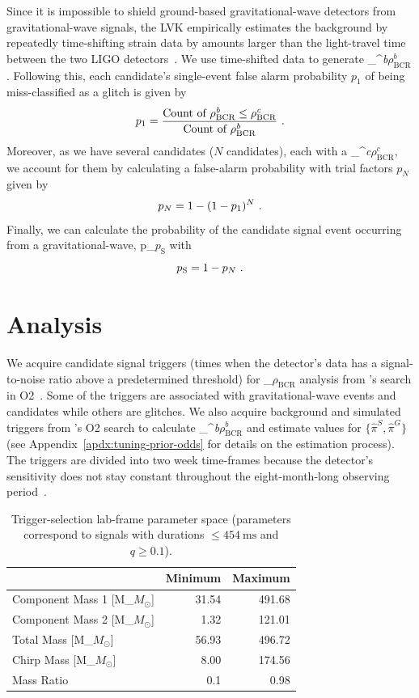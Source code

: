 \documentclass[
 nofootinbib,
 amsmath,amssymb,
 aps,
 twocolumn,
 superscriptaddress
]{revtex4-2}
\newcommand{\pycbc}{{\sc {{PyCBC}}}\xspace}
\newcommand{\fancytext}[1]{{\relax\ifmmode#1\else $#1$\fi}\xspace}
\newcommand{\mathcmd}[1]{{\sc \relax\ifmmode#1\else $#1$\fi}\xspace}
\newcommand{\bcr}{\mathcmd{\rho_\text{BCR}}}
\newcommand{\bgrdbcr}{\mathcmd{\rho_\text{BCR}^\textit{b}}}
\newcommand{\candbcr}{\mathcmd{\rho_\text{BCR}^\textit{c}}}
\newcommand{\msun}{\mathcmd{M_\odot}}
\newcommand{\fap}{\mathcmd{p_N}}
\newcommand{\pastrobcr}{\fancytext{p_\text{S}}}
\begin{document}
Since it is impossible to shield ground-based gravitational-wave detectors from gravitational-wave signals, the LVK empirically estimates the background by repeatedly time-shifting strain data by amounts larger than the light-travel time between the two LIGO detectors~\cite{GWTC1}. We use time-shifted data to generate \bgrdbcr. Following this, each candidate's single-event false alarm probability $p_1$ of being miss-classified as a glitch is given by
\begin{equation}
    p_1 = \frac{\text{Count of } \bgrdbcr \leq \candbcr}{\text{Count of } \bgrdbcr} \ .
\end{equation}
Moreover, as we have several candidates ($N$ candidates), each with a \candbcr, we account for them by calculating a false-alarm probability with trial factors $p_N$ given by
\begin{equation}
    \fap = 1 - (1-p_1)^N \ .
\end{equation}
Finally, we can calculate the probability of the candidate signal event occurring from  a gravitational-wave, \pastrobcr with 
\begin{equation}
\pastrobcr = 1 - \fap \ . 
\end{equation}


\section{Analysis}\label{sec:Analysis}

We acquire candidate signal triggers (times when the detector's data has a signal-to-noise ratio above a predetermined threshold) for \bcr analysis from \pycbc's search in O2~\cite{pycbc_code, pycbc_og0, pycbc_og1, pycbc_og2, pycbc_og3, pycbc_og4, pycbc_og5, pycbc_og6, public_ligo_o2_triggers}.  Some of the triggers are associated with gravitational-wave events and candidates while others are glitches. We also acquire background and simulated triggers from \pycbc's O2 search to calculate \bgrdbcr and estimate values for $\{\hat{\pi}^S,\hat{\pi}^G\}$ (see Appendix~\ref{apdx:tuning-prior-odds} for details on the estimation process). The triggers are divided into two week time-frames because the detector's sensitivity does not stay constant throughout the eight-month-long observing period~\cite{pycbc_og4}.

\begin{table}[t]
\caption[BBH parameters correspond to duration $\leq454\ \text{ms}$]{\label{tab:parameters}Trigger-selection lab-frame parameter space (parameters correspond to signals with durations $\leq454 \ \text{ms}$ and $q\geq0.1$).}
\centering
\begin{tabular}{lrr}
\toprule
           & Minimum & Maximum\\
\midrule
Component Mass 1 [\msun] & 31.54 & 491.68\\
Component Mass 2 [\msun] & 1.32 & 121.01\\
Total Mass [\msun] & 56.93 & 496.72\\
Chirp Mass [\msun] & 8.00 & 174.56\\
Mass Ratio & 0.1 & 0.98\\
\end{tabular}
\end{table}
\end{document}
